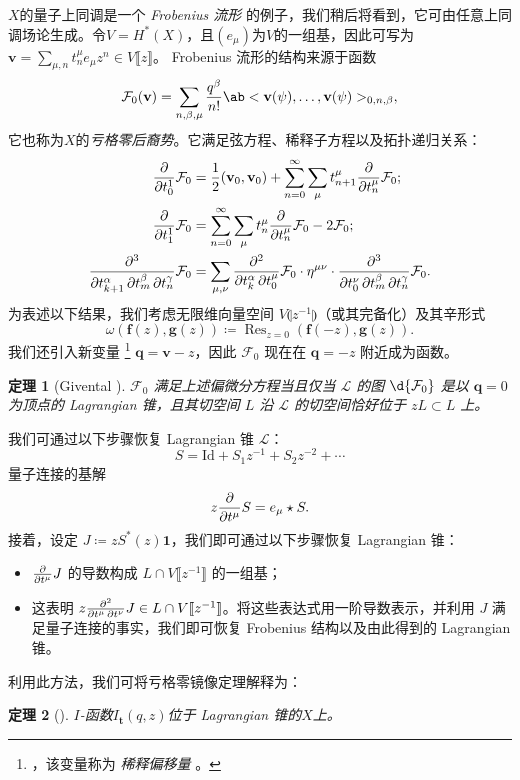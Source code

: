 \documentclass{amsart}
\newtheorem{thm}{定理}[section]
\theoremstyle{definition}
\theoremstyle{remark}
\theoremstyle{plain}
\theoremstyle{definition}
\theoremstyle{remark}
\newcommand{\mc}[1]{\mathcal{#1}}
\newcommand{\mbf}[1]{\mathbf{#1}}
\newcommand{\bv}{\mbf{v}}
\newcommand{\bq}{\mbf{q}}
\newcommand{\mr}[1]{\mathrm{#1}}
\newcommand{\on}[1]{\operatorname{#1}}
\newcommand{\1}{\mathbf{1}}
\newcommand{\2}{\mathbf{2}}
\newcommand{\3}{\mathbf{3}}
\newcommand{\ps}[1]{\llbracket #1 \rrbracket}
\newcommand{\ls}[1]{\llparenthesis #1 \rrparenthesis}
\begin{document}
\(X\)的量子上同调是一个 \textit{Frobenius 流形} 的例子，我们稍后将看到，它可由任意上同调场论生成。令\(V = H^*(X)\)，且\((e_{\mu})\)为\(V\)的一组基，因此可写为 $\bv = \sum_{\mu,n} t^{\mu}_n e_{\mu} z^n \in V\ps{z}$。
Frobenius 流形的结构来源于函数
\[
    \mc{F}_0(\bv) = \sum_{n, \beta, \mu} \frac{q^{\beta}}{n!} \ab<\bv(\psi), \ldots, \bv(\psi)>_{0,n,\beta},
\]
它也称为\(X\)的\textit{亏格零后裔势}。它满足弦方程、稀释子方程以及拓扑递归关系：
\begin{align*}
    \pdv{}{t_0^1} \mc{F}_0 &= \frac{1}{2} (\bv_0, \bv_0) + \sum_{n=0}^{\infty} \sum_{\mu} t_{n+1}^{\mu} \pdv{}{t_n^{\mu}} \mc{F}_0; \\
    \pdv{}{t_1^1} \mc{F}_0 &= \sum_{n=0}^{\infty} \sum_{\mu} t_n^{\mu} \pdv{}{t_n^{\mu}}\mc{F}_0 - 2 \mc{F}_0; \\
    \pdv{}{t_{k+1}^{\alpha},t_m^{\beta},t_n^{\gamma}} \mc{F}_0 &= \sum_{\mu,\nu} \pdv{}{t_k^{\alpha},t_0^{\mu}} \mc{F}_0 \cdot \eta^{\mu\nu} \cdot \pdv{}{t_0^{\nu},t_{m}^{\beta},t_n^{\gamma}} \mc{F}_0.
\end{align*}
为表述以下结果，我们考虑无限维向量空间 $V\ls{z^{-1}}$（或其完备化）及其辛形式
\[ \omega(\mbf{f}(z), \mbf{g}(z)) \coloneqq \on{Res}_{z=0}(\mbf{f}(-z), \mbf{g}(z)). \]
我们还引入新变量 \footnote{，该变量称为 \textit{ 稀释偏移量 }。} $\bq = \bv - z$，因此 $\mc{F}_0$ 现在在 $\bq = -z$ 附近成为函数。

\begin{thm}[Givental {\cite{Givental2004}}]
    $\mc{F}_0$ 满足上述偏微分方程当且仅当 $\mc{L}$ 的图 $\d{\mc{F}_0}$ 是以 $\bq = 0$ 为顶点的 Lagrangian 锥，且其切空间 $L$ 沿 $\mc{L}$ 的切空间恰好位于 $zL \subset L$ 上。
\end{thm}

我们可通过以下步骤恢复 Lagrangian 锥 $\mc{L}$：
\[ S = \mr{Id} + S_1 z^{-1} + S_2 z^{-2} + \cdots \]
量子连接的基解
\[ z \pdv{}{t^{\mu}}S = e_{\mu} \star S. \]
接着，设定 $J \coloneqq z S^*(z) \1$，我们即可通过以下步骤恢复 Lagrangian 锥：
\begin{itemize}
    \item $\pdv{}{t^{\mu}} J$ 的导数构成 $L \cap V\ps{z^{-1}}$ 的一组基；
    \item 这表明 $z \pdv{}{t^{\mu},t^{\nu}} J \in L \cap V \ps{z^{-1}}$。将这些表达式用一阶导数表示，并利用 $J$ 满足量子连接的事实，我们即可恢复 Frobenius 结构以及由此得到的 Lagrangian 锥。
\end{itemize}

利用此方法，我们可将亏格零镜像定理解释为：
\begin{thm}[{\cite{Givental1998}}]
    \(I\)-函数\(I_{\mbf{t}}(q,z)\)位于 Lagrangian 锥的\(X\)上。
\end{thm}
\end{document}
